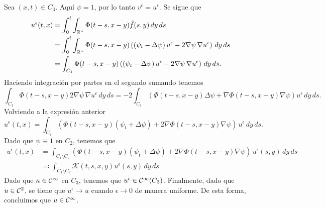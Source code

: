 \documentclass[../edp.tex]{subfiles}
\begin{document}
\begin{Demostracion}
	Sea \((x,t) \in C_3\). Aquí \(\psi = 1\), por lo tanto
	\(v^{\epsilon} = u^{\epsilon}\). Se sigue que
	\begin{align*}
		u^{\epsilon}(t,x)
		&=
		\int_{0}^{t}
		\int_{\mathbb{R}^n}
			\Phi(t - s, x - y)
			\tilde{f}(s,y)
		\, dy\, ds	
		\\&=
		\int_{0}^{t}
		\int_{\mathbb{R}^n}
			\Phi(t - s, x - y)
			\left(
			(\psi_{t} - \Delta \psi)
			\, u^{\epsilon}
			-
			2 \nabla \psi\, \nabla u^{\epsilon}
			\right)
		\, dy \, ds 
		\\&=
		\int_{C_1}
			\Phi(t - s, x - y)
			\left(
			(\psi_{t} - \Delta \psi)
			\, u^{\epsilon}
			-
			2 \nabla \psi\, \nabla u^{\epsilon}
			\right)
		\, dy \, ds.
	\end{align*}
	Haciendo integración por partes en el segundo sumando tenemos
	\begin{displaymath}
		\int_{C_1}	
			\Phi(t - s, x - y)
			2 \nabla \psi\, \nabla u^{\epsilon}
		\, dy\, ds
		=
		-2
		\int_{C_1}	
		\left(
			\Phi(t - s, x - y)
			\Delta \psi
			+
			\nabla \Phi(t - s, x - y)
			\nabla \psi
		\right) u^{\epsilon}
		\, dy\, ds.
	\end{displaymath}
	Volviendo a la expresión anterior
	\begin{displaymath}
		u^{\epsilon}(t,x)
		=
		\int_{C_1}
		\left(
			\Phi(t - s, x - y)
			(\psi_{t} + \Delta \psi)
			+
			2
			\nabla \Phi(t - s, x - y)
			\nabla \psi
		\right) \, u^{\epsilon}
		\, dy \, ds.
	\end{displaymath}
	Dado que \(\psi \equiv 1\) en \(C_2\), tenemos que
	\begin{align*}
		u^{\epsilon}(t,x)
		&=
		\int_{C_1 \setminus C_2}
		\left(
			\Phi(t - s, x - y)
			(\psi_{t} + \Delta \psi)
			+
			2
			\nabla \Phi(t - s, x - y)
			\nabla \psi
		\right) \, u^{\epsilon}(s,y)
		\, dy \, ds
		\\&\eqqcolon
		\int_{C_1 \setminus C_2}
			\mathcal{K}(t,s,x,y)
			u^{\epsilon}(s,y)
		\, dy \, ds
	\end{align*}
	Dado que \(\kappa \in \mathcal{C}^{\infty}\) en \(C_3\), tenemos que
	\(u^{\epsilon} \in \mathcal{C}^{\infty}(C_3)\). Finalmente, dado que
	\(u\in \mathcal{C}^{2}\), se tiene que \(u^{\epsilon} \to u\) cuando
	\(\epsilon \to 0\) de manera uniforme. De esta forma, concluimos
	que \(u\in \mathcal{C}^{\infty}\).
\end{Demostracion}
\end{document}
